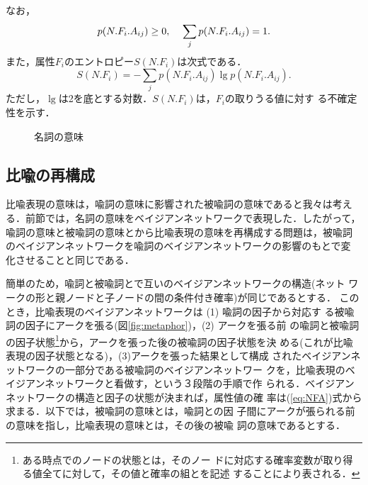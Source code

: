 なお，
\begin{displaymath}
  p(N.F_i.A_{ij}) \geq 0,\mbox{\hspace{1em}}\sum_{j}p(N.F_i.A_{ij}) = 1.
\end{displaymath}
また，属性$F_i$のエントロピー$S(N.F_i)$は次式である．
\begin{equation}
  \label{eq:entropy}
  S(N.F_i) = - \sum_{j}p(N.F_i.A_{ij}) \lg p(N.F_i.A_{ij}).
\end{equation}
ただし，$\lg$は2を底とする対数．$S(N.F_i)$は，$F_i$の取りうる値に対す
る不確定性を示す．

\begin{figure}[htbp]
  \begin{center}
    \leavevmode
    
  \end{center}
  \caption{名詞の意味}
  \label{fig:meaning}
\end{figure}

\subsection{比喩の再構成}
\label{sec:re-composition}

比喩表現の意味は，喩詞の意味に影響された被喩詞の意味であると我々は考え
る．前節では，名詞の意味をベイジアンネットワークで表現した．したがって，
喩詞の意味と被喩詞の意味とから比喩表現の意味を再構成する問題は，被喩詞
のベイジアンネットワークを喩詞のベイジアンネットワークの影響のもとで変
化させることと同じである．

簡単のため，喩詞と被喩詞とで互いのベイジアンネットワークの構造(ネット
ワークの形と親ノードと子ノードの間の条件付き確率)が同じであるとする．
このとき，比喩表現のベイジアンネットワークは (1) 喩詞の因子から対応す
る被喩詞の因子にアークを張る(図\ref{fig:metaphor})，(2) アークを張る前
の喩詞と被喩詞の因子状態\footnote{ある時点でのノードの状態とは，そのノー
ドに対応する確率変数が取り得る値全てに対して，その値と確率の組とを記述
することにより表される．}から，アークを張った後の被喩詞の因子状態を決
める(これが比喩表現の因子状態となる)，(3)アークを張った結果として構成
されたベイジアンネットワークの一部分である被喩詞のベイジアンネットワー
クを，比喩表現のベイジアンネットワークと看做す，という３段階の手順で作
られる．ベイジアンネットワークの構造と因子の状態が決まれば，属性値の確
率は(\ref{eq:NFA})式から求まる．以下では，被喩詞の意味とは，喩詞との因
子間にアークが張られる前の意味を指し，比喩表現の意味とは，その後の被喩
詞の意味であるとする．


